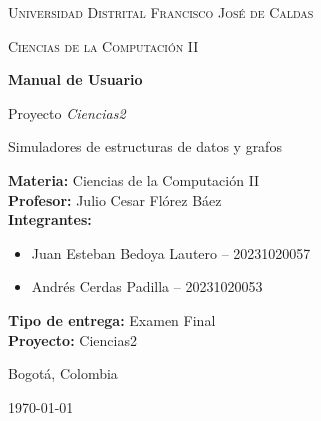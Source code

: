 \documentclass[10pt,onecolumn]{IEEEtran}
\begin{document}
\begin{titlepage}
\centering
\vspace*{1.5cm}

{\scshape\LARGE Universidad Distrital Francisco José de Caldas \par}
\vspace{0.5cm}
{\scshape\Large Ciencias de la Computación II \par}
\vspace{2.1cm}

{\Huge\bfseries Manual de Usuario \par}
\vspace{0.5cm}
{\LARGE Proyecto \textit{Ciencias2} \par}
\vspace{0.8cm}
{\large Simuladores de estructuras de datos y grafos \par}

\vspace{2cm}
\begin{flushleft}
\large
\textbf{Materia:} Ciencias de la Computación II \\[0.35cm]
\textbf{Profesor:} Julio Cesar Flórez Báez \\[0.35cm]
\textbf{Integrantes:}
\begin{itemize}
  \item Juan Esteban Bedoya Lautero -- 20231020057
  \item Andrés Cerdas Padilla -- 20231020053
\end{itemize}
\textbf{Tipo de entrega:} Examen Final \\[0.35cm]
\textbf{Proyecto:} Ciencias2
\end{flushleft}

\vfill
{\large Bogotá, Colombia \par}
{\large \today \par}
\end{titlepage}

\begin{abstract}
Este manual de usuario describe el uso del ejecutable del proyecto académico \textit{Ciencias2}, una aplicación orientada a la simulación interactiva de estructuras de datos, búsquedas, tablas hash, arboles, indices de almacenamiento y grafos. El documento presenta la forma de abrir el sistema, navegar por su interfaz, utilizar cada módulo, guardar y restaurar estados, e interpretar los elementos visibles para el usuario final. La redacción se mantiene en un nivel técnico, claro y académico, sin detallar la implementación interna del sistema.
\end{abstract}
\end{document}
